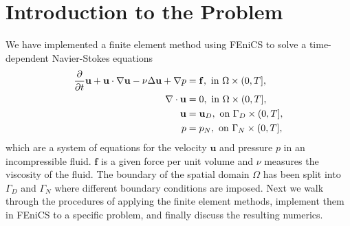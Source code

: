 \section{Introduction to the Problem}
\label{sec:introToProblem}

We have implemented a finite element method using FEniCS to solve a time-dependent Navier-Stokes equations
\vspace{-0.2cm}
\begin{align}
    \frac{\partial}{\partial t} \mathbf{u} + \mathbf{u} \cdot \nabla \mathbf{u} - \nu \Delta \mathbf{u} + \nabla p & = \mathbf{f}, \text{ in } \Omega \times (0,T],    
    \label{eq:NavierStokes}\\
    \nabla \cdot \mathbf{u} & = 0,  \text{ in } \Omega \times (0,T],
    \label{eq:Incompressibility}\\
    \mathbf{u} & = \mathbf{u}_D, \text{ on } \Gamma_D \times (0,T],
    \label{eq:DirichletBoundary}\\
    p & = p_N, \text{ on } \Gamma_N \times (0,T],
    \label{eq:NeumannBoundary}
\vspace{-0.2cm}
\end{align}
which are a system of equations for the velocity $\mathbf{u}$ and pressure $p$ in an incompressible fluid. $\mathbf{f}$ is a given force per unit volume and $\nu$ measures the viscosity of the fluid. The boundary of the spatial domain $\Omega$ has been split into $\Gamma_D$ and $\Gamma_N$ where different boundary conditions are imposed. Next we walk through the procedures of applying the finite element methods, implement them in FEniCS to a specific problem, and finally discuss the resulting numerics.
